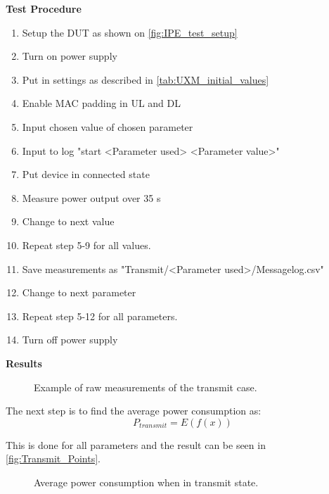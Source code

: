 \textbf{Test Procedure}\\
\begin{enumerate}
\item Setup the \gls{DUT} as shown on \autoref{fig:IPE_test_setup}
\item Turn on power supply 
\item Put in settings as described in \autoref{tab:UXM_initial_values} 
\item Enable MAC padding in UL and DL
\item Input chosen value of chosen parameter
\item Input to log "start <Parameter used> <Parameter value>"
\item Put device in connected state
\item Measure power output over 35 s
\item Change to next value
\item Repeat step 5-9 for all values.
\item Save measurements as "Transmit/<Parameter used>/Messagelog.csv"
\item Change to next parameter
\item Repeat step 5-12 for all parameters.
\item Turn off power supply
\end{enumerate}

\textbf{Results}\\
\begin{figure}[H]
\centering
\resizebox{0.6\textwidth}{!}{
}
\caption{Example of raw measurements of the transmit case.}
\label{fig:Transmit_raw}
\end{figure}

The next step is to find the average power consumption as:
\begin{equation}
P_{transmit} = E(f(x))
\end{equation}
\begin{where}
\end{where}

This is done for all parameters and the result can be seen in \autoref{fig:Transmit_Points}.

\begin{figure}[H]
\centering
\begin{minipage}{0.48\textwidth}
\resizebox{\textwidth}{!}{
}
\end{minipage}
\hfill
\begin{minipage}{0.48\textwidth}
\resizebox{\textwidth}{!}{
}
\end{minipage}
\caption{Average power consumption when in transmit state.}
\label{fig:Transmit_Points}
\end{figure}

